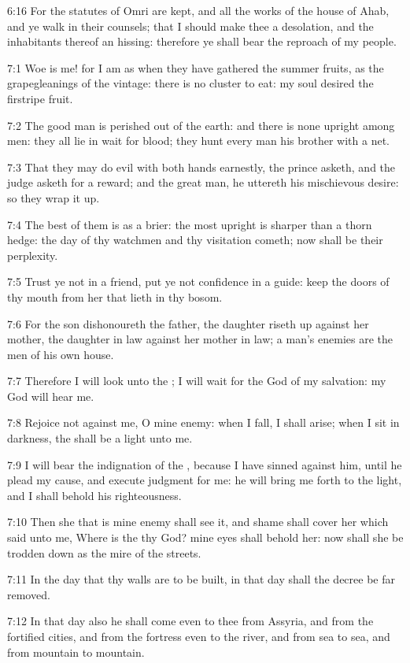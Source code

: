 6:16 For the statutes of Omri are kept, and all the works of the house of Ahab, and ye walk in their counsels; that I should make thee a desolation, and the inhabitants thereof an hissing: therefore ye shall bear the reproach of my people.

7:1 Woe is me! for I am as when they have gathered the summer fruits, as the grapegleanings of the vintage: there is no cluster to eat: my soul desired the firstripe fruit.

7:2 The good man is perished out of the earth: and there is none upright among men: they all lie in wait for blood; they hunt every man his brother with a net.

7:3 That they may do evil with both hands earnestly, the prince asketh, and the judge asketh for a reward; and the great man, he uttereth his mischievous desire: so they wrap it up.

7:4 The best of them is as a brier: the most upright is sharper than a thorn hedge: the day of thy watchmen and thy visitation cometh; now shall be their perplexity.

7:5 Trust ye not in a friend, put ye not confidence in a guide: keep the doors of thy mouth from her that lieth in thy bosom.

7:6 For the son dishonoureth the father, the daughter riseth up against her mother, the daughter in law against her mother in law; a man's enemies are the men of his own house.

7:7 Therefore I will look unto the \LORD; I will wait for the God of my salvation: my God will hear me.

7:8 Rejoice not against me, O mine enemy: when I fall, I shall arise; when I sit in darkness, the \LORD shall be a light unto me.

7:9 I will bear the indignation of the \LORD, because I have sinned against him, until he plead my cause, and execute judgment for me: he will bring me forth to the light, and I shall behold his righteousness.

7:10 Then she that is mine enemy shall see it, and shame shall cover her which said unto me, Where is the \LORD thy God? mine eyes shall behold her: now shall she be trodden down as the mire of the streets.

7:11 In the day that thy walls are to be built, in that day shall the decree be far removed.

7:12 In that day also he shall come even to thee from Assyria, and from the fortified cities, and from the fortress even to the river, and from sea to sea, and from mountain to mountain.

